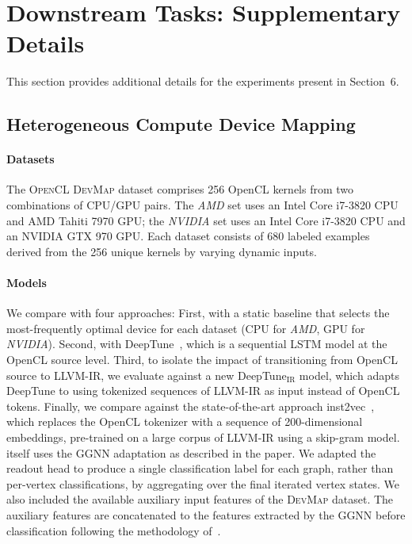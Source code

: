 \section{Downstream Tasks: Supplementary Details}

This section provides additional details for the experiments present in
Section~6.


\subsection{Heterogeneous Compute Device Mapping}
\label{app:devmap_details}

\paragraph{Datasets} The \textsc{OpenCL DevMap} dataset comprises 256 OpenCL
kernels from two combinations of CPU/GPU pairs. The \emph{AMD} set uses an Intel
Core i7-3820 CPU and AMD Tahiti 7970 GPU; the \emph{NVIDIA} set uses an Intel
Core i7-3820 CPU and an NVIDIA GTX 970 GPU. Each dataset consists of 680 labeled
examples derived from the 256 unique kernels by varying dynamic inputs.


\paragraph{Models}

We compare \programl with four approaches: First, with a static baseline that
selects the most-frequently optimal device for each dataset (CPU for \emph{AMD},
GPU for \emph{NVIDIA}). Second, with DeepTune~\citep{Cummins2017b}, which is a
sequential LSTM model at the OpenCL source level. Third, to isolate the impact
of transitioning from OpenCL source to LLVM-IR, we evaluate against a new
DeepTune$_{\text{IR}}$ model, which adapts DeepTune to using tokenized sequences
of LLVM-IR as input instead of OpenCL tokens. Finally, we compare against the
state-of-the-art approach inst2vec~\citep{Ben-nun2018}, which replaces the
OpenCL tokenizer with a sequence of 200-dimensional embeddings, pre-trained on a
large corpus of LLVM-IR using a skip-gram model. \programl itself uses the GGNN
adaptation as described in the paper. We adapted the readout head to produce a
single classification label for each graph, rather than per-vertex
classifications, by aggregating over the final iterated vertex states. We also
included the available auxiliary input features of the \textsc{DevMap} dataset.
The auxiliary features are concatenated to the features extracted by the GGNN
before classification following the methodology of~\citet{Cummins2017b}.

